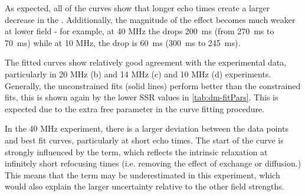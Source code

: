 \begin{landscape}
\begin{table}[h]
\centering

\caption[Best fit values to the experimental data at different fields]{Best fit values to the experimental data at different fields, shaded columns indicate fixed parameters in fitting. Note that the \TtwoO values are going to be dependent on the state of the blood in the flow circuit, so are not necessarily reflective of the diffusion/exchange effects.}
\label{tab:dm-fitPars}



\vspace{1cm}

\end{table}
\end{landscape}

As expected, all of the curves show that longer echo times create a larger decrease in the \Ttwo.
Additionally, the magnitude of the effect becomes much weaker at lower field - for example, at 40 MHz the \Ttwo drops \SI{200}{ms} (from \SI{270}{ms} to \SI{70}{ms}) while at 10 MHz, the \Ttwo drop is \SI{60}{ms} (\SI{300}{ms} to \SI{245}{ms}).

The fitted curves show relatively good agreement with the experimental data, particularly in 20 MHz (b) and 14 MHz (c) and 10 MHz (d) experiments.
Generally, the unconstrained fits (solid lines) perform better than the constrained fits, this is shown again by the lower SSR values in \autoref{tab:dm-fitPars}.
This is expected due to the extra free parameter in the curve fitting procedure.

In the 40 MHz experiment, there is a larger deviation between the data points and best fit curves, particularly at short echo times.
The start of the curve is strongly influenced by the \TtwoO term, which reflects the intrinsic relaxation at infinitely short refocusing times (i.e. removing the effect of exchange or diffusion.)
This means that the  \TtwoO term may be underestimated in this experiment, which would also explain the larger uncertainty relative to the other field strengths.

